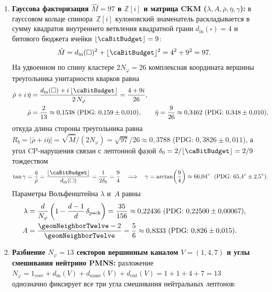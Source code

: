 \begin{proposition}[Матрицы смешивания CKM и PMNS из $N_\varphi=13$ и $\hat M=97$]
\label{prop:ckm-pmns-sectors}
\begin{enumerate}[leftmargin=*]
\item \textbf{Гауссова факторизация $\hat M = 97$ в $\mathbb{Z}[i]$ и матрица CKM ($\lambda,A,\bar\rho,\bar\eta,\gamma$):}
  в гауссовом кольце спинора~$\mathbb{Z}[i]$ кулоновский знаменатель раскладывается в сумму квадратов внутреннего ветвления квадратной грани $d_{\mathrm{in}}(\square)=4$ и битового бюджета ячейки $\lfloor\caBitBudget\rfloor=9$:
  \[
    \hat M = d_{\mathrm{in}}(\square)^2 + \lfloor\caBitBudget\rfloor^2 = 4^2 + 9^2 = 97.
  \]
  На удвоенном по спину кластере $2N_\varphi = 26$ комплексная координата вершины треугольника унитарности кварков равна
  \begin{align*}
    \bar\rho + i\,\bar\eta &= \frac{d_{\mathrm{in}}(\square) + i\,\lfloor\caBitBudget\rfloor}{2\,N_\varphi} = \frac{4 + 9i}{26},\\
    \bar\rho &= \frac{2}{13}\approx 0{,}1538\ (\text{PDG: }0{,}159\pm 0{,}010),\qquad
    \bar\eta = \frac{9}{26}\approx 0{,}3462\ (\text{PDG: }0{,}348\pm 0{,}010),
  \end{align*}
  откуда длина стороны треугольника равна $R_b = |\bar\rho+i\bar\eta| = \sqrt{\hat M}/(2N_\varphi) = \sqrt{97}/26 \approx 0{,}3788$ (PDG: $0{,}3826\pm 0{,}011$),
  а угол CP-нарушения связан с лептонной фазой $\delta_0 = 2/\lfloor\caBitBudget\rfloor = 2/9$ тождеством
  \[
    \tan\gamma = \frac{\bar\eta}{\bar\rho} = \frac{\lfloor\caBitBudget\rfloor}{d_{\mathrm{in}}(\square)} = \frac{1}{2\delta_0} = \frac{9}{4}
    \quad\Longrightarrow\quad
    \gamma = \arctan\!\left(\frac{9}{4}\right) \approx 66{,}04^\circ\ \ (\text{PDG: }65{,}4^\circ\pm 2{,}5^\circ).
  \]
  Параметры Вольфенштейна $\lambda$ и~$A$ равны
  \begin{align*}
    \lambda &= \frac{d}{N_\varphi}\left(1 - \frac{d-1}{d}\,\delta_{\mathrm{pack}}\right) = \frac{35}{156} \approx 0{,}22436\ (\text{PDG: }0{,}22500\pm 0{,}00067),\\
    A &= \frac{\geomNeighborTwelve - 2}{\geomNeighborTwelve} = \frac{5}{6} \approx 0{,}8333\ (\text{PDG: }0{,}826\pm 0{,}015).
  \end{align*}
\item \textbf{Разбиение $N_\varphi = 13$ секторов вершинным каналом $V=(1,4,7)$ и углы смешивания нейтрино PMNS:}
  разложение $N_\varphi = 1_{\mathrm{core}} + d_{\mathrm{in}}(V) + d_{\mathrm{same}}(V) + d_{\mathrm{out}}(V) = 1 + 1 + 4 + 7 = 13$ однозначно фиксирует все три угла смешивания нейтральных лептонов:

\end{enumerate}
\end{proposition}
